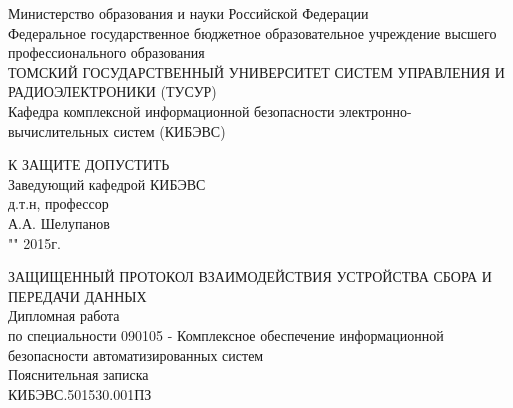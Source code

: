 \newpage
{}

\begin{center}
Министерство образования и науки Российской Федерации\\
Федеральное государственное бюджетное образовательное учреждение высшего профессионального образования\\
ТОМСКИЙ ГОСУДАРСТВЕННЫЙ УНИВЕРСИТЕТ СИСТЕМ УПРАВЛЕНИЯ И РАДИОЭЛЕКТРОНИКИ (ТУСУР)\\
Кафедра комплексной информационной безопасности электронно-вычислительных систем (КИБЭВС)\\
\end{center}

\hfill
\begin{minipage}[right]{0.42\linewidth}
\begin{singlespace}
 К ЗАЩИТЕ ДОПУСТИТЬ \\
 Заведующий кафедрой КИБЭВС \\
 д.т.н, профессор \\
 \underline{\hspace{2.5cm}}А.А. Шелупанов \\
 "\underline{\hspace{1cm}}"\underline{\hspace{3cm}} 2015г.\\
\end{singlespace} 
\end{minipage}


\begin{center}
ЗАЩИЩЕННЫЙ ПРОТОКОЛ ВЗАИМОДЕЙСТВИЯ УСТРОЙСТВА СБОРА И ПЕРЕДАЧИ ДАННЫХ \\
Дипломная работа \\
по специальности 090105 - Комплексное обеспечение информационной безопасности автоматизированных систем \\
\vspace{0.5cm}
Пояснительная записка \\
КИБЭВС.501530.001ПЗ
\vspace{0.5cm}
\end{center}


